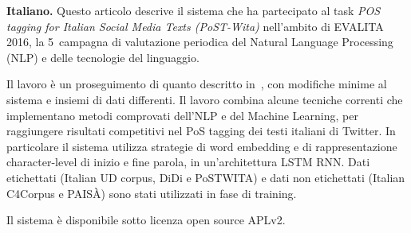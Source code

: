 \documentclass[11pt]{article}
\title{\mytitle}
\author{Egon W.~Stemle \\
    Institute for Specialised Communication and Multilingualism \\
    EURAC Research \\
    Bolzano/Bozen, Italy \\
    {\tt egon.stemle@eurac.edu}}
\date{}
\begin{document}
\maketitle

\begin{abstract} %
\textbf{English.}  
This article describes the system that participated in the \emph{POS tagging
for Italian Social Media Texts} (PoSTWITA) task of the 5\textsuperscript{th}
periodic evaluation campaign of Natural Language Processing (NLP) and speech
tools for the Italian language EVALITA 2016.

The work is a continuation of  with minor
modifications to the system and different data sets.  
It combines a small assertion of trending techniques, which implement matured
methods, from NLP and ML to achieve competitive results on PoS tagging of
Italian Twitter texts; in particular, the system uses word embeddings and
character-level representations of word beginnings and endings in a LSTM RNN
architecture.  
Labelled data (Italian UD corpus, DiDi and PoSTWITA) and unlabbelled data
(Italian C4Corpus and PAIS{\`A}) were used for training.

The system is available under the APLv2 open-source license.
\end{abstract}

\begin{abstract-alt}
\textrm{\bf{Italiano.}}
Questo articolo descrive il sistema che ha partecipato al task \emph{POS
tagging for Italian Social Media Texts (PoST-Wita)} nell'ambito di EVALITA
2016, la 5\textdegree~campagna di valutazione periodica del Natural Language
Processing (NLP) e delle tecnologie del linguaggio.

Il lavoro {\`e} un proseguimento di quanto descritto
in~, con modifiche minime al sistema e insiemi di
dati differenti.
Il lavoro combina alcune tecniche correnti che implementano metodi comprovati
dell'NLP e del Machine Learning, per raggiungere risultati competitivi nel PoS
tagging dei testi italiani di Twitter.
In particolare il sistema utilizza strategie di word embedding e di
rappresentazione character-level di inizio e fine parola, in un'architettura
LSTM RNN.
Dati etichettati (Italian UD corpus, DiDi e PoSTWITA) e dati non etichettati
(Italian C4Corpus e PAIS{\`A}) sono stati utilizzati in fase di training.

Il sistema {\`e} disponibile sotto licenza open source APLv2.
\end{abstract-alt}
\end{document}
